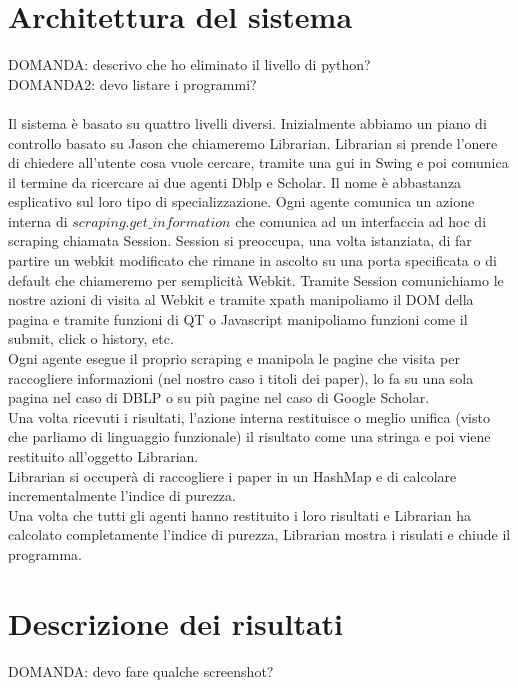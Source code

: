 \documentclass[12pt]{article}
\begin{document}
\section{Architettura del sistema}
DOMANDA: descrivo che ho eliminato il livello di python? \\
DOMANDA2: devo listare i programmi? \\
\\
Il sistema \`e basato su quattro livelli diversi. Inizialmente abbiamo un piano di controllo basato su Jason che chiameremo Librarian. Librarian si prende l'onere di chiedere all'utente cosa vuole cercare, tramite una gui in Swing e poi comunica il termine da ricercare ai due agenti Dblp e Scholar. Il nome \`e abbastanza esplicativo sul loro tipo di specializzazione. Ogni agente comunica un azione interna di $scraping.get\_information$ che comunica ad un interfaccia ad hoc di scraping chiamata Session. Session si preoccupa, una volta istanziata, di far partire un webkit modificato che rimane in ascolto su una porta specificata o di default che chiameremo per semplicit\`a Webkit. Tramite Session comunichiamo le nostre azioni di visita al Webkit e tramite xpath manipoliamo il DOM della pagina e tramite funzioni di QT o Javascript manipoliamo funzioni come il submit, click o history, etc. \\
Ogni agente esegue il proprio scraping e manipola le pagine che visita per raccogliere informazioni (nel nostro caso i titoli dei paper), lo fa su una sola pagina nel caso di DBLP o su più pagine nel caso di Google Scholar.\\
Una volta ricevuti i risultati, l'azione interna restituisce o meglio unifica (visto che parliamo di linguaggio funzionale) il risultato come una stringa e poi viene restituito all'oggetto Librarian. \\
Librarian si occuperà di raccogliere i paper in un HashMap e di calcolare incrementalmente l'indice di purezza. \\
Una volta che tutti gli agenti hanno restituito i loro risultati e Librarian ha calcolato completamente l'indice di purezza, Librarian mostra i risulati e chiude il programma. 

\section{Descrizione dei risultati}
DOMANDA: devo fare qualche screenshot? \\
\end{document}
